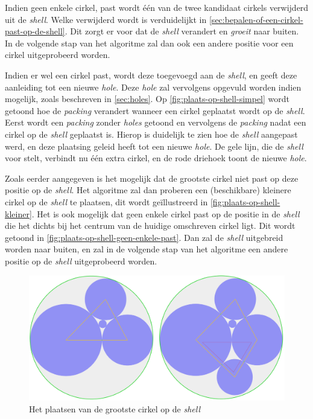 \documentclass[12pt,a4paper,oneside]{book}
\begin{document}
Indien geen enkele cirkel, past wordt één van de twee kandidaat cirkels verwijderd uit de \textit{shell}.
Welke verwijderd wordt is verduidelijkt in \autoref{sec:bepalen-of-een-cirkel-past-op-de-shell}.
Dit zorgt er voor dat de \textit{shell} verandert en \textit{groeit} naar buiten.
In de volgende stap van het algoritme zal dan ook een andere positie voor een cirkel uitgeprobeerd worden.

Indien er wel een cirkel past, wordt deze toegevoegd aan de \textit{shell}, en geeft deze aanleiding tot een nieuwe \textit{hole}.
Deze \textit{hole} zal vervolgens opgevuld worden indien mogelijk, zoals beschreven in \autoref{sec:holes}.
Op \autoref{fig:plaats-op-shell-simpel} wordt getoond hoe de \textit{packing} verandert wanneer een cirkel geplaatst wordt op de \textit{shell}.
Eerst wordt een \textit{packing} zonder \textit{holes} getoond en vervolgens de \textit{packing} nadat een cirkel op de \textit{shell} geplaatst is.
Hierop is duidelijk te zien hoe de \textit{shell} aangepast werd, en deze plaatsing geleid heeft tot een nieuwe \textit{hole}.
De gele lijn, die de \textit{shell} voor stelt, verbindt nu één extra cirkel, en de rode driehoek toont de nieuwe \textit{hole}.

Zoals eerder aangegeven is het mogelijk dat de grootste cirkel niet past op deze positie op de \textit{shell}.
Het algoritme zal dan proberen een (beschikbare) kleinere cirkel op de \textit{shell} te plaatsen, dit wordt geïllustreerd in \autoref{fig:plaats-op-shell-kleiner}.
Het is ook mogelijk dat geen enkele cirkel past op de positie in de \textit{shell} die het dichts bij het centrum van de huidige omschreven cirkel ligt.
Dit wordt getoond in \autoref{fig:plaats-op-shell-geen-enkele-past}.
Dan zal de \textit{shell} uitgebreid worden naar buiten, en zal in de volgende stap van het algoritme een andere positie op de \textit{shell} uitgeprobeerd worden.

\begin{figure}
  \centering
  \includegraphics[width=1.0\textwidth]{plaats-op-shell-simpel.png}
  \caption{Het plaatsen van de grootste cirkel op de \textit{shell}} \label{fig:plaats-op-shell-simpel} 
\end{figure}
\end{document}
